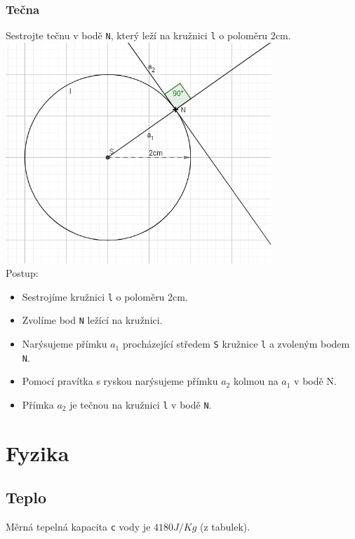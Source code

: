 \documentclass[12pt]{article}
\begin{document}
\subsubsection{Tečna}
Sestrojte tečnu v bodě \texttt{N}, který leží na kružnici \texttt{l} o poloměru 2cm.\\
\includegraphics[width=10cm]{tangent.png}\\
Postup:
\begin{itemize}
\setlength\itemsep{1px}
\item Sestrojíme kružnici \texttt{l} o poloměru 2cm.
\item Zvolíme bod \texttt{N} ležící na kružnici.
\item Narýsujeme přímku $ a_1 $ procházející středem \texttt{S} kružnice \texttt{l} a zvoleným bodem \texttt{N}.
\item Pomocí pravítka s ryskou narýsujeme přímku $ a_2 $ kolmou na $ a_1 $ v bodě N.
\item Přímka $ a_2 $ je tečnou na kružnici \texttt{l} v bodě \texttt{N}.
\end{itemize}

\pagebreak
\section{Fyzika}
\subsection{Teplo}
Měrná tepelná kapacita \texttt{c} vody je $4180 J/Kg$ (z tabulek).
\end{document}
